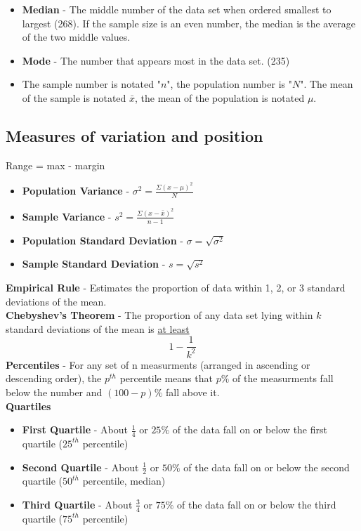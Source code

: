 \documentclass[a4paper]{article}
\let\bf\textbf
\begin{document}
\begin{itemize}
    \item \bf{Median} - The middle number of the data set when ordered smallest to largest (268). If the sample size is an even number, the median is the average of the two middle values.

    \item \bf{Mode} - The number that appears most in the data set. (235)

    \item The sample number is notated "$n$", the population number is "$N$". The mean of the sample is notated $\bar{x}$, the mean of the population is notated $\mu$.
\end{itemize}

\newpage
\subsection{Measures of variation and position}
Range = max - margin
\begin{itemize}
    \item \bf{Population Variance} - $\displaystyle\sigma^2 = \frac{\Sigma (x - \mu)^2}{N}$
    \item \bf{Sample Variance} - $\displaystyle s^2 = \frac{\Sigma (x - \bar{x})^2}{n - 1}$
    \item \bf{Population Standard Deviation} - $\displaystyle\sigma = \sqrt{\sigma^2}$
    \item \bf{Sample Standard Deviation} - $\displaystyle s = \sqrt{s^2}$
\end{itemize}
\bf{Empirical Rule} - Estimates the proportion of data within 1, 2, or 3 standard deviations of the mean.\\
\bf{Chebyshev's Theorem} - The proportion of any data set lying within $k$ standard deviations of the mean is \underline{at least} 
\begin{equation}
    1 - \frac{1}{k^2}
\end{equation}
\bf{Percentiles} - For any set of n measurments (arranged in ascending or descending order), the $p^{th}$ percentile means that $p\%$ of the measurments fall below the number and $(100 - p)\%$ fall above it.
\vspace{2mm}\\
\bf{Quartiles}
\begin{itemize}
    \item \bf{First Quartile} - About $\frac{1}{4}$ or $25\%$ of the data fall on or below the first quartile ($25^{th}$ percentile)
    \item \bf{Second Quartile} - About $\frac{1}{2}$ or $50\%$ of the data fall on or below the second quartile ($50^{th}$ percentile, median)
    \item \bf{Third Quartile} - About $\frac{3}{4}$ or $75\%$ of the data fall on or below the third quartile ($75^{th}$ percentile)
\end{itemize}
\end{document}
